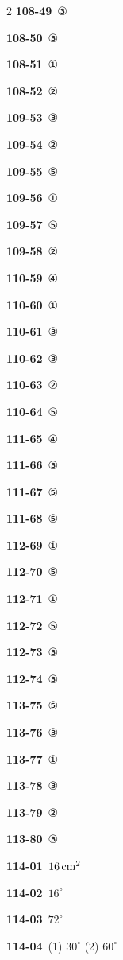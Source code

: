 \documentclass[10pt,a4paper]{article}
\begin{document}
\begin{multicols}{2}
\noindent\textbf{108-49}\ ③\par
\noindent\textbf{108-50}\ ③\par
\noindent\textbf{108-51}\ ①\par
\noindent\textbf{108-52}\ ②\par
\noindent\textbf{109-53}\ ③\par
\noindent\textbf{109-54}\ ②\par
\noindent\textbf{109-55}\ ⑤\par
\noindent\textbf{109-56}\ ①\par
\noindent\textbf{109-57}\ ⑤\par
\noindent\textbf{109-58}\ ②\par
\noindent\textbf{110-59}\ ④\par
\noindent\textbf{110-60}\ ①\par
\noindent\textbf{110-61}\ ③\par
\noindent\textbf{110-62}\ ③\par
\noindent\textbf{110-63}\ ②\par
\noindent\textbf{110-64}\ ⑤\par
\noindent\textbf{111-65}\ ④\par
\noindent\textbf{111-66}\ ③\par
\noindent\textbf{111-67}\ ⑤\par
\noindent\textbf{111-68}\ ⑤\par
\noindent\textbf{112-69}\ ①\par
\noindent\textbf{112-70}\ ⑤\par
\noindent\textbf{112-71}\ ①\par
\noindent\textbf{112-72}\ ⑤\par
\noindent\textbf{112-73}\ ③\par
\noindent\textbf{112-74}\ ③\par
\noindent\textbf{113-75}\ ⑤\par
\noindent\textbf{113-76}\ ③\par
\noindent\textbf{113-77}\ ①\par
\noindent\textbf{113-78}\ ③\par
\noindent\textbf{113-79}\ ②\par
\noindent\textbf{113-80}\ ③\par
\noindent\textbf{114-01}\ $16\mkern3mu \mathrm{cm}^2$\par
\noindent\textbf{114-02}\ $16^\circ$\par
\noindent\textbf{114-03}\ $72^\circ$\par
\noindent\textbf{114-04}\ (1) $30^\circ$ (2) $60^\circ$\par

\end{multicols}
\end{document}

